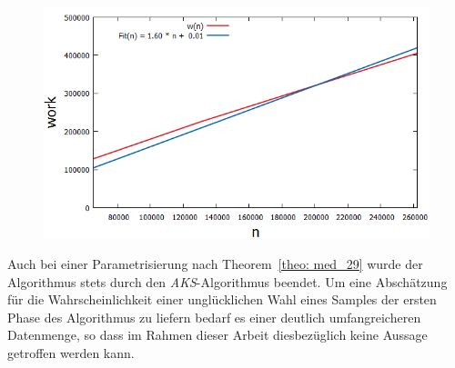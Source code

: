 \begin{figure}[H]
\begin{minipage}[t]{.30\textwidth}
        \includegraphics[width=1.25\textwidth]{pictures/med_algo_theo29_fit_work.png}
    \end{minipage}
    \vspace*{-0.1cm}
    \label{fig: med_theo29_med}
\end{figure}

\noindent
Auch bei einer Parametrisierung nach Theorem~\ref{theo: med_29} wurde der Algorithmus \RM stets durch den \textit{AKS}-Algorithmus beendet. Um eine Abschätzung für die Wahrscheinlichkeit einer unglücklichen Wahl eines Samples der ersten Phase des Algorithmus zu liefern bedarf es einer deutlich umfangreicheren Datenmenge, so dass im Rahmen dieser Arbeit diesbezüglich keine Aussage getroffen werden kann. 


